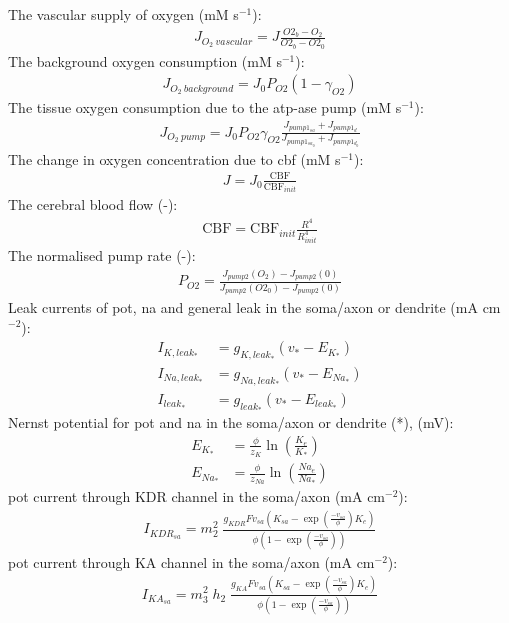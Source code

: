 \documentclass[11pt]{elsarticle}
\newcommand{\mAcm}{mA cm$^{-2}$\xspace}
\newcommand{\psec}{s$^{-1}$\xspace}
\newcommand{\na}{\gls{na}\xspace}
\newcommand{\pot}{\gls{pot}\xspace}
\begin{document}
%
The vascular supply of oxygen (mM \psec):	
	\begin{align}
	J_{O_2 \: vascular} = J \frac{O2_b - O_2}{O2_b - O2_0}
	\end{align}
%	
The background oxygen consumption (mM \psec):
	\begin{align}
	J_{O_2 \: background} = J_0 P_{O2} (1 - \gamma_{O2})
	\end{align}
%	
The tissue oxygen consumption due to the \gls{atp}-ase pump (mM \psec):
	\begin{align}
	J_{O_2 \: pump} = J_0 P_{O2} \gamma_{O2} \frac{J_{pump1_{sa}} + J_{pump1_{d}}}{J_{pump1_{sa_0}} + J_{pump1_{d_0}}}
	\end{align}
%
The change in oxygen concentration due to \gls{cbf} (mM \psec):
	\begin{align}
	J = J_0 \frac{\text{CBF}}{\text{CBF}_{init}}
	\end{align}
%
The cerebral blood flow (-):
	\begin{align}
	\text{CBF} =  \text{CBF}_{init} \frac{R^4}{R_{init}^4}
	\end{align}
%
The normalised pump rate (-):
	\begin{align}
	P_{O2} = \frac{J_{pump2}(O_2) - J_{pump2}(0)}{J_{pump2}(O2_0) - J_{pump2}(0)}
	\end{align}
%
Leak currents of \pot, \na and general leak in the soma/axon or dendrite (\mAcm):
	\begin{align}
	I_{K,leak_{*}} &= g_{K,leak_{*}} (v_{*} - E_{K_{*}}) \\
	I_{Na,leak_{*}} &= g_{Na,leak_{*}} (v_{*} - E_{Na_{*}}) \\
	I_{leak_{*}} &= g_{leak_{*}} (v_{*} - E_{leak_{*}}) 
	\end{align}
%
Nernst potential for \pot and \na in the soma/axon or dendrite (*), (mV):
\begin{align}
E_{K_{*}} &= \frac{\phi}{z_K} \ln \left(\frac{K_e}{K_{*}}\right) \\
E_{Na_{*}} &= \frac{\phi}{z_{Na}} \ln \left(\frac{Na_e}{Na_{*}}\right)
\end{align}
%		
\pot current through KDR channel in the soma/axon (\mAcm):
\begin{align}
I_{KDR_{sa}} = m_2^2 \; \frac{  g_{KDR} F v_{sa} \left( K_{sa} - \exp \left( \frac{-v_{sa}}{\phi}  \right) K_e  \right)   }{   \phi \left( 1 - \exp  \left(  \frac{-v_{sa}}{\phi}  \right)  \right)   }
\end{align}
%
\pot current through KA channel in the soma/axon (\mAcm):
\begin{align}
I_{KA_{sa}} = m_3^2 \; h_2 \; \frac{  g_{KA} F v_{sa} \left( K_{sa} - \exp \left( \frac{-v_{sa}}{\phi}  \right) K_e  \right)   }{   \phi \left( 1 - \exp  \left(  \frac{-v_{sa}}{\phi}  \right)  \right)   }
\end{align}
\end{document}
